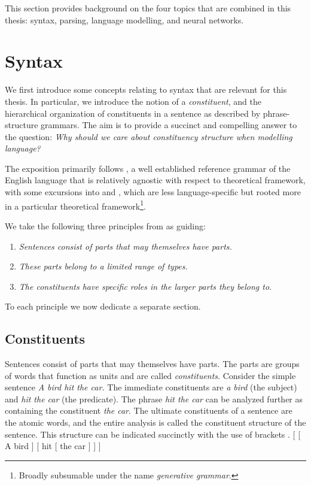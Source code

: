 % 

This section provides background on the four topics that are combined in this thesis: syntax, parsing, language modelling, and neural networks.

\section{Syntax}
We first introduce some concepts relating to syntax that are relevant for this thesis. In particular, we introduce the notion of a \textit{constituent}, and the hierarchical organization of constituents in a sentence as described by phrase-structure grammars. The aim is to provide a succinct and compelling answer to the question: \textit{Why should we care about constituency structure when modelling language?}

The exposition primarily follows \citet{huddleston2002grammar}, a well established reference grammar of the English language that is relatively agnostic with respect to theoretical framework, with some excursions into \citet{carnie2010constituent} and \citet{everaert2015structures}, which are less language-specific but rooted more in a particular theoretical framework\footnote{Broadly subsumable under the name \textit{generative grammar}.}.

We take the following three principles from \citet{huddleston2002grammar} as guiding:
\begin{enumerate}[noitemsep]
  \item \textit{Sentences consist of parts that may themselves have parts.}
  \item \textit{These parts belong to a limited range of types.}
  \item \textit{The constituents have specific roles in the larger parts they belong to.}
\end{enumerate}
To each principle we now dedicate a separate section.

\subsection{Constituents}
Sentences consist of parts that may themselves have parts. The parts are groups of words that function as units and are called \textit{constituents}. Consider the simple sentence \textit{A bird hit the car.} The immediate constituents are \textit{a bird} (the subject) and \textit{hit the car} (the predicate). The phrase \textit{hit the car} can be analyzed further as containing the constituent \textit{the car}. The ultimate constituents of a sentence are the atomic words, and the entire analysis is called the constituent structure of the sentence. This structure can be indicated succinctly with the use of brackets
\exi. [ [ A bird ] [ hit [ the car ] ] ]

